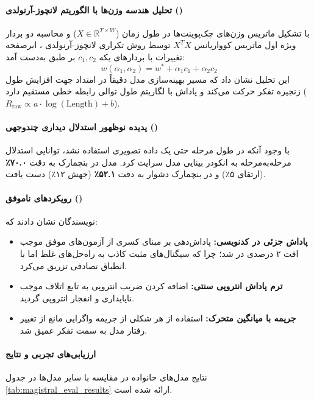 \paragraph*{تحلیل هندسه وزن‌ها با الگوریتم لانچوز-آرنولدی ()}
با تشکیل ماتریس وزن‌های چک‌پوینت‌ها در طول زمان ($X \in \mathbb{R}^{T \times W}$) و محاسبه دو بردار ویژه اول ماتریس کوواریانس $X^T X$ توسط روش تکراری لانچوز-آرنولدی \cite{saad2003iterative}، ابرصفحه تغییرات با بردارهای یکه $c_1, c_2$ بر طبق \cite{li2018visualizing} به‌دست آمد:
\begin{equation}
    w(\alpha_1, \alpha_2) = w^* + \alpha_1 c_1 + \alpha_2 c_2
\end{equation}
این تحلیل نشان داد که مسیر بهینه‌سازی مدل دقیقاً در امتداد جهت افزایش طول زنجیره تفکر حرکت می‌کند و پاداش با لگاریتم طول توالی رابطه خطی مستقیم دارد ($R_{\text{raw}} \propto a \cdot \log(\text{Length}) + b$).

\paragraph*{پدیده نوظهور استدلال دیداری چندوجهی ()}
با وجود آنکه در طول مرحله  حتی یک داده تصویری استفاده نشد، توانایی استدلال مرحله‌به‌مرحله به انکودر بینایی مدل سرایت کرد. مدل در بنچمارک  \cite{yue2024mmmu} به دقت \textbf{۷۰.۰٪} (ارتقای ۵٪) و در بنچمارک دشوار  \cite{yue2025mmmupro} به دقت \textbf{۵۲.۱٪} (جهش ۱۲٪) دست یافت.

\paragraph*{رویکردهای ناموفق ()}
نویسندگان نشان دادند که:
\begin{itemize}
    \item \textbf{پاداش جزئی در کدنویسی:} پاداش‌دهی بر مبنای کسری از آزمون‌های موفق موجب افت ۲ درصدی در  شد؛ چرا که سیگنال‌های مثبت کاذب به راه‌حل‌های غلط اما با انطباق تصادفی تزریق می‌کرد.
    \item \textbf{ترم پاداش انتروپی سنتی:} اضافه کردن ضریب انتروپی به تابع اتلاف موجب ناپایداری و انفجار انتروپی گردید.
    \item \textbf{جریمه  با میانگین متحرک:} استفاده از هر شکلی از جریمه واگرایی  مانع از تغییر رفتار مدل به سمت تفکر عمیق شد.
\end{itemize}

\paragraph*{ارزیابی‌های تجربی و نتایج}
نتایج مدل‌های خانواده  در مقایسه با سایر مدل‌ها در جدول \ref{tab:magistral_eval_results} ارائه شده است.

